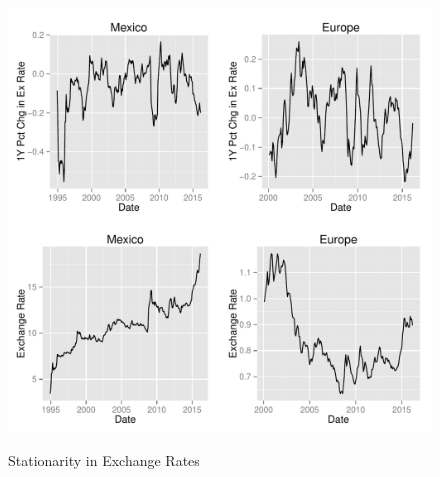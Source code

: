 \documentclass{sig-alternate-05-2015}
\begin{document}
\begin{figure}
\centering
\caption{Stationarity in Exchange Rates}
\includegraphics[scale=0.45]{stationarity.pdf}
\label{fig:rates_time}
\end{figure}
\end{document}
